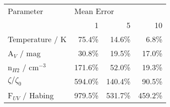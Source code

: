 \begin{tabular}{lrrr}
\toprule
           Parameter & \multicolumn{3}{l}{Mean Error} \\
                     &          1 &      5 &     10 \\
\midrule
     Temperature / K &      75.4\% &  14.6\% &   6.8\% \\
         A$_V$ / mag &      30.8\% &  19.5\% &  17.0\% \\
n$_{H2}$ / cm$^{-3}$ &     171.6\% &  52.0\% &  19.3\% \\
     $\zeta/\zeta_0$ &     594.0\% & 140.4\% &  90.5\% \\
   F$_{UV}$ / Habing &     979.5\% & 531.7\% & 459.2\% \\
\bottomrule
\end{tabular}
